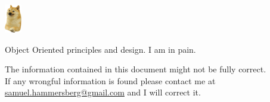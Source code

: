 \documentclass{article}
\begin{document}
\includegraphics[width=2em]{2ljhyisqtna51.png}
\begin{center}
    \vspace*{\fill}
    {\Huge Object Oriented principles and design.}\newline
    {\small I am in pain.}
    \vspace*{\fill}
    \mbox{}
    \vfill
    \begin{flushright}
        The information contained in this document might not be fully correct.\\
        If any wrongful information is found please contact me at\\
        \underline{samuel.hammersberg@gmail.com} and I will correct it.
    \end{flushright}
\end{center}
\newpage
\end{document}
